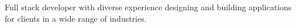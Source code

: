 

\begin{cvparagraph}

Full stack developer with diverse experience designing and building applications for clients in a wide range of industries.
\end{cvparagraph}
